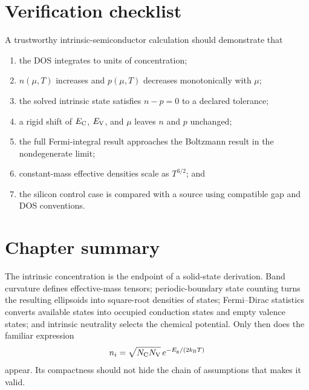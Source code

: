 \section{Verification checklist}

A trustworthy intrinsic-semiconductor calculation should demonstrate that
\begin{enumerate}
  \item the DOS integrates to units of concentration;
  \item $n(\mu,T)$ increases and $p(\mu,T)$ decreases monotonically with $\mu$;
  \item the solved intrinsic state satisfies $n-p=0$ to a declared tolerance;
  \item a rigid shift of $E_{\mathrm C}$, $E_{\mathrm V}$, and $\mu$ leaves $n$ and $p$ unchanged;
  \item the full Fermi-integral result approaches the Boltzmann result in the
        nondegenerate limit;
  \item constant-mass effective densities scale as $T^{3/2}$; and
  \item the silicon control case is compared with a source using compatible
        gap and DOS conventions.
\end{enumerate}

\section{Chapter summary}

The intrinsic concentration is the endpoint of a solid-state derivation.  Band
curvature defines effective-mass tensors; periodic-boundary state counting turns
the resulting ellipsoids into square-root densities of states; Fermi--Dirac
statistics converts available states into occupied conduction states and empty
valence states; and intrinsic neutrality selects the chemical potential.  Only
then does the familiar expression
\begin{equation*}
  n_i=\sqrt{N_{\mathrm C}N_{\mathrm V}}\,e^{-E_{\mathrm g}/(2k_{\mathrm B} T)}
\end{equation*}
appear.  Its compactness should not hide the chain of assumptions that makes it
valid.
